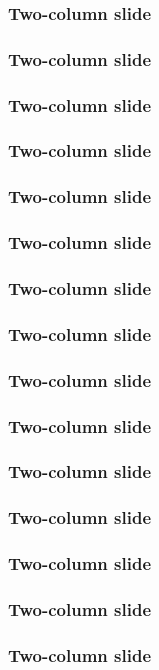 \documentclass{beamer}
\begin{document}
\begin{frame}
	\frametitle{Two-column slide}	
\end{frame}


\begin{frame}
	\frametitle{Two-column slide}	
\end{frame}


\begin{frame}
	\frametitle{Two-column slide}	
\end{frame}


\begin{frame}
	\frametitle{Two-column slide}	
\end{frame}


\begin{frame}
	\frametitle{Two-column slide}	
\end{frame}


\begin{frame}
	\frametitle{Two-column slide}	
\end{frame}


\begin{frame}
	\frametitle{Two-column slide}	
\end{frame}


\begin{frame}
	\frametitle{Two-column slide}	
\end{frame}


\begin{frame}
	\frametitle{Two-column slide}	
\end{frame}

\begin{frame}
	\frametitle{Two-column slide}	
\end{frame}

\begin{frame}
	\frametitle{Two-column slide}	
\end{frame}

\begin{frame}
	\frametitle{Two-column slide}	
\end{frame}


\begin{frame}
	\frametitle{Two-column slide}	
\end{frame}


\begin{frame}
	\frametitle{Two-column slide}	
\end{frame}


\begin{frame}
	\frametitle{Two-column slide}	
\end{frame}
\end{document}
